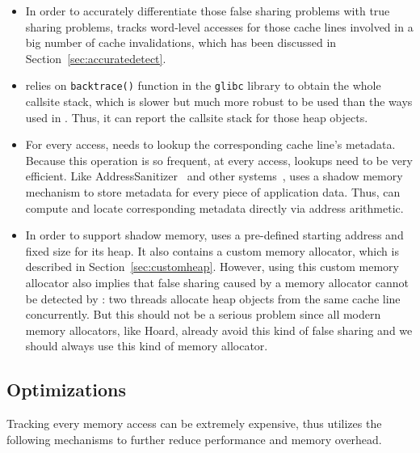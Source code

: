 \begin{itemize}
\item

In order to accurately differentiate those false sharing problems with true sharing problems, \Predator{} tracks word-level accesses for those cache lines involved in a big number of cache invalidations, which has been discussed in Section~\ref{sec:accuratedetect}.


\item
\predator{} relies on \texttt{backtrace()} function in the \texttt{glibc} library to obtain the whole callsite stack, which is slower but much more robust to be used than the ways used in \SheriffDetect{}. Thus, it can report the callsite stack for those heap objects. 


\item
For every access, \Predator{} needs to lookup the corresponding cache line's metadata. Because this operation is so frequent, at every access, lookups need to be very efficient. Like AddressSanitizer~\cite{AddressSanitizer} and other systems~\cite{Valgrind, qinzhao}, \Predator{} uses a shadow memory mechanism to store metadata for every piece of application data.  Thus, \Predator{} can compute and locate corresponding metadata directly via address arithmetic.

\item
In order to support shadow memory, \Predator{} uses a pre-defined starting address and fixed size for its heap.  It also contains a custom memory allocator, which is described in Section~\ref{sec:customheap}.  However, using this custom memory allocator also implies that false sharing caused by a memory allocator cannot be detected by \Predator{}: two threads allocate heap objects from the same cache line concurrently. But this should not be a serious problem since  all modern memory allocators, like Hoard, already avoid this kind of false sharing and we should always use this kind of memory allocator.

\end{itemize} 
 
\subsection{Optimizations}
\label{optimization}
Tracking every memory access can be extremely expensive, thus \Predator{} utilizes the following mechanisms to further reduce performance and memory overhead.

